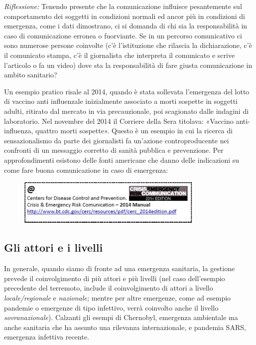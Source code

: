 \emph{Riflessione:} Tenendo presente che la comunicazione influisce
pesantemente sul comportamento dei soggetti in condizioni normali ed
ancor più in condizioni di emergenza, come i dati dimostrano, ci si
domanda di chi sia la responsabilità in caso di comunicazione erronea o
fuorviante. Se in un percorso comunicativo ci sono numerose persone
coinvolte (c'è l'istituzione che rilascia la dichiarazione, c'è il
comunicato stampa, c'è il giornalista che interpreta il comunicato e
scrive l'articolo o fa un video) dove sta la responsabilità di fare
giusta comunicazione in ambito sanitario?

Un esempio pratico risale al 2014, quando è stata sollevata l'emergenza
del lotto di vaccino anti influenzale inizialmente associato a morti
sospette in soggetti adulti, ritirato dal mercato in via precauzionale,
poi scagionato dalle indagini di laboratorio. Nel novembre del 2014 il
Corriere della Sera titolava: «Vaccino anti-influenza, quattro morti
sospette». Questo è un esempio in cui la ricerca di sensazionalismo da
parte dei giornalisti fa un'azione controproducente nei confronti di un
messaggio corretto di sanità pubblica e prevenzione. Per approfondimenti
esistono delle fonti americane che danno delle indicazioni su come fare
buona comunicazione in caso di emergenza:

\begin{figure}[!ht]
\centering
	\includegraphics[width=0.8\textwidth]{26/image4.jpeg}
	\end{figure}

\subsection{Gli attori e i livelli}

In generale, quando siamo di fronte ad una emergenza sanitaria, la
gestione prevede il coinvolgimento di più attori e più livelli (nel caso
dell'esempio precedente del terremoto, include il coinvolgimento di
attori a livello \emph{locale/regionale} e \emph{nazionale;} mentre per
altre emergenze, come ad esempio pandemie o emergenze di tipo infettivo,
verrà coinvolto anche il livello \emph{sovranazionale}). Calzanti gli
esempi di Chernobyl, emergenza ambientale ma anche sanitaria che ha
assunto una rilevanza internazionale, e pandemia SARS, emergenza
infettiva recente.

